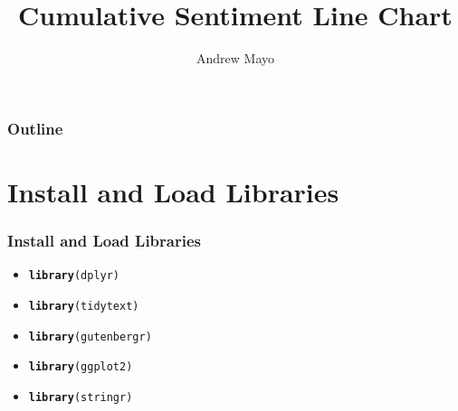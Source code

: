 \documentclass{beamer}\usepackage[]{graphicx}\usepackage[]{color}
\makeatletter
\newcommand{\hlstd}[1]{\textcolor[rgb]{0.345,0.345,0.345}{#1}}%
\newcommand{\hlkwd}[1]{\textcolor[rgb]{0.737,0.353,0.396}{\textbf{#1}}}%
\newenvironment{kframe}{%
 \def\at@end@of@kframe{}%
 \ifinner\ifhmode%
  \def\at@end@of@kframe{\end{minipage}}%
  \begin{minipage}{\columnwidth}%
 \fi\fi%
 \def\FrameCommand##1{\hskip\@totalleftmargin \hskip-\fboxsep
 \colorbox{shadecolor}{##1}\hskip-\fboxsep
     \hskip-\linewidth \hskip-\@totalleftmargin \hskip\columnwidth}%
 \MakeFramed {\advance\hsize-\width
   \@totalleftmargin\z@ \linewidth\hsize
   \@setminipage}}%
 {\par\unskip\endMakeFramed%
 \at@end@of@kframe}
\newenvironment{knitrout}{}{} %
\makeatother
\begin{document}
\title{Cumulative Sentiment Line Chart}
\author{Andrew Mayo}

\begin{frame}
  \titlepage
\end{frame}

\begin{frame}
  \frametitle{Outline}
    \tableofcontents
\end{frame}


\section{Install and Load Libraries}
\begin{frame}[fragile]
  \frametitle{Install and Load Libraries}
    \begin{itemize}
      \item<1->
\begin{knitrout}
\color{fgcolor}\begin{kframe}
\begin{alltt}
\hlkwd{library}\hlstd{(dplyr)}
\end{alltt}
\end{kframe}
\end{knitrout}
      \item<2->
\begin{knitrout}
\color{fgcolor}\begin{kframe}
\begin{alltt}
\hlkwd{library}\hlstd{(tidytext)}
\end{alltt}
\end{kframe}
\end{knitrout}
      \item<3->
\begin{knitrout}
\color{fgcolor}\begin{kframe}
\begin{alltt}
\hlkwd{library}\hlstd{(gutenbergr)}
\end{alltt}
\end{kframe}
\end{knitrout}
      \item<4->
\begin{knitrout}
\color{fgcolor}\begin{kframe}
\begin{alltt}
\hlkwd{library}\hlstd{(ggplot2)}
\end{alltt}
\end{kframe}
\end{knitrout}
      \item<5->
\begin{knitrout}
\color{fgcolor}\begin{kframe}
\begin{alltt}
\hlkwd{library}\hlstd{(stringr)}
\end{alltt}
\end{kframe}
\end{knitrout}
    \end{itemize}
\end{frame}
\end{document}
